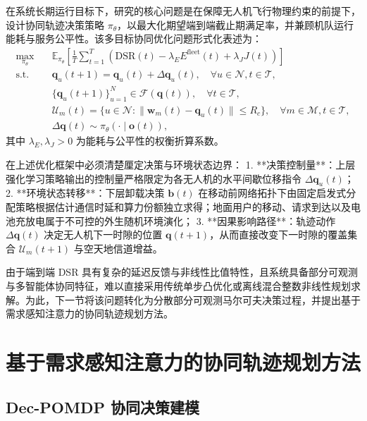 在系统长期运行目标下，研究的核心问题是在保障无人机飞行物理约束的前提下，设计协同轨迹决策策略 $\pi_\theta$，以最大化期望端到端截止期满足率，并兼顾机队运行能耗与服务公平性。该多目标协同优化问题形式化表述为：
\begin{equation}
    \begin{aligned}
    \max_{\pi_\theta}\quad & \mathbb E_{\pi_\theta}\left[\frac{1}{T}\sum_{t=1}^T \left(\mathrm{DSR}(t) - \lambda_E E^{\mathrm{fleet}}(t) + \lambda_J J(t)\right)\right] \\
    \text{s.t.}\quad 
    & \mathbf q_u(t+1) = \mathbf q_u(t) + \Delta\mathbf q_u(t), \quad \forall u\in\mathcal N, t\in\mathcal T,\\
    & \{\mathbf q_u(t+1)\}_{u=1}^N \in \mathcal F(\mathbf q(t)), \quad \forall t\in\mathcal T,\\
    & \mathcal U_m(t) = \{u\in\mathcal N: \|\mathbf w_m(t) - \mathbf q_u(t)\| \leq R_c\}, \quad \forall m\in\mathcal M, t\in\mathcal T,\\
    & \Delta\mathbf q(t) \sim \pi_\theta(\cdot \mid \mathbf o(t)),
    \end{aligned}
    \label{eq:ch3-problem-formulation}
\end{equation}
其中 $\lambda_E, \lambda_J > 0$ 为能耗与公平性的权衡折算系数。

在上述优化框架中必须清楚厘定决策与环境状态边界：
1. **决策控制量**：上层强化学习策略输出的控制量严格限定为各无人机的水平间歇位移指令 $\Delta\mathbf q_u(t)$；
2. **环境状态转移**：下层卸载决策 $\mathbf b(t)$ 在移动前网络拓扑下由固定启发式分配策略根据估计通信时延和算力份额独立求得；地面用户的移动、请求到达以及电池充放电属于不可控的外生随机环境演化；
3. **因果影响路径**：轨迹动作 $\Delta\mathbf q(t)$ 决定无人机下一时隙的位置 $\mathbf q(t+1)$，从而直接改变下一时隙的覆盖集合 $\mathcal U_m(t+1)$ 与空天地信道增益。

由于端到端 DSR 具有复杂的延迟反馈与非线性比值特性，且系统具备部分可观测与多智能体协同特征，难以直接采用传统单步凸优化或离线混合整数非线性规划求解。为此，下一节将该问题转化为分散部分可观测马尔可夫决策过程，并提出基于需求感知注意力的协同轨迹规划方法。

\section{基于需求感知注意力的协同轨迹规划方法}
\label{sec:upper-dec-pomdp}

\subsection{Dec-POMDP 协同决策建模}
\label{sec:dec-pomdp-motivation}
\label{sec:upper-reward}

